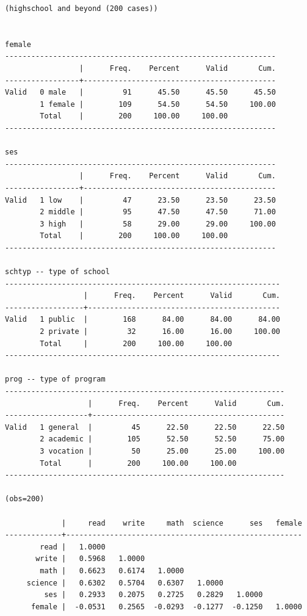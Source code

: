 \documentclass[
]{book}
\begin{document}
\begin{verbatim}
(highschool and beyond (200 cases))


female
--------------------------------------------------------------
                 |      Freq.    Percent      Valid       Cum.
-----------------+--------------------------------------------
Valid   0 male   |         91      45.50      45.50      45.50
        1 female |        109      54.50      54.50     100.00
        Total    |        200     100.00     100.00           
--------------------------------------------------------------

ses
--------------------------------------------------------------
                 |      Freq.    Percent      Valid       Cum.
-----------------+--------------------------------------------
Valid   1 low    |         47      23.50      23.50      23.50
        2 middle |         95      47.50      47.50      71.00
        3 high   |         58      29.00      29.00     100.00
        Total    |        200     100.00     100.00           
--------------------------------------------------------------

schtyp -- type of school
---------------------------------------------------------------
                  |      Freq.    Percent      Valid       Cum.
------------------+--------------------------------------------
Valid   1 public  |        168      84.00      84.00      84.00
        2 private |         32      16.00      16.00     100.00
        Total     |        200     100.00     100.00           
---------------------------------------------------------------

prog -- type of program
----------------------------------------------------------------
                   |      Freq.    Percent      Valid       Cum.
-------------------+--------------------------------------------
Valid   1 general  |         45      22.50      22.50      22.50
        2 academic |        105      52.50      52.50      75.00
        3 vocation |         50      25.00      25.00     100.00
        Total      |        200     100.00     100.00           
----------------------------------------------------------------

(obs=200)

             |     read    write     math  science      ses   female
-------------+------------------------------------------------------
        read |   1.0000
       write |   0.5968   1.0000
        math |   0.6623   0.6174   1.0000
     science |   0.6302   0.5704   0.6307   1.0000
         ses |   0.2933   0.2075   0.2725   0.2829   1.0000
      female |  -0.0531   0.2565  -0.0293  -0.1277  -0.1250   1.0000
\end{verbatim}
\end{document}
